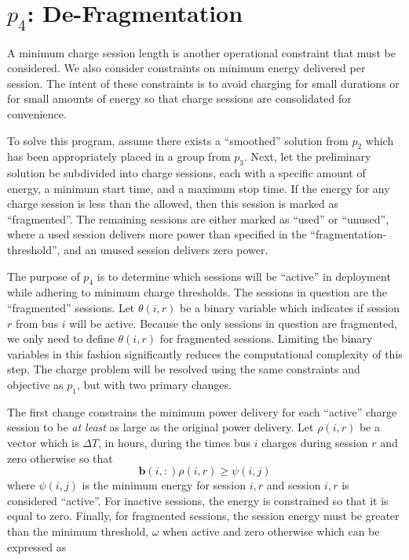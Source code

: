\section{$p_4$: De-Fragmentation\label{sec:defragmentation}}
A minimum charge session length is another operational constraint that must be considered. We also consider constraints on minimum energy delivered per session. The intent of these constraints is to avoid charging for small durations or for small amounts of energy so that charge sessions are consolidated for convenience. 
\par To solve this program, assume there exists a ``smoothed'' solution from $p_2$ which has been appropriately placed in a group from $p_3$. Next, let the preliminary solution be subdivided into charge sessions, each with a specific amount of energy, a minimum start time, and a maximum stop time. If the energy for any charge session is less than the allowed, then this session is marked as ``fragmented''.  The remaining sessions are either marked as ``used'' or ``unused'', where a used session delivers more power than specified in the ``fragmentation-threshold'', and an unused session delivers zero power. 
\par The purpose of $p_4$ is to determine which sessions will be ``active'' in deployment while adhering to minimum charge thresholds. The sessions in question are the ``fragmented'' sessions.  Let $\theta(i,r)$ be a binary variable which indicates if session $r$ from bus $i$ will be active. Because the only sessions in question are fragmented, we only need to define $\theta(i,r)$ for fragmented sessions. Limiting the binary variables in this fashion significantly reduces the computational complexity of this step.  The charge problem will be resolved using the same constraints and objective as $p_1$, but with two primary changes.
\par The first change constrains the minimum power delivery for each ``active'' charge session to be {\it at least} as large as the original power delivery. Let $\rho(i,r)$ be a vector which is $\Delta T$, in hours, during the times bus $i$ charges during session $r$ and zero otherwise so that  
\begin{equation}\label{eqn:defragmentation:active}
	\mathbf{b}(i,:)\rho(i,r) \ge \psi(i,j)
\end{equation}
where $\psi(i,j)$ is the minimum energy for session $i,r$ and session $i,r$ is considered ``active''. For inactive sessions, the energy is constrained so that it is equal to zero. Finally, for fragmented sessions, the session energy must be greater than the minimum threshold, $\omega$ when active and zero otherwise which can be expressed as
